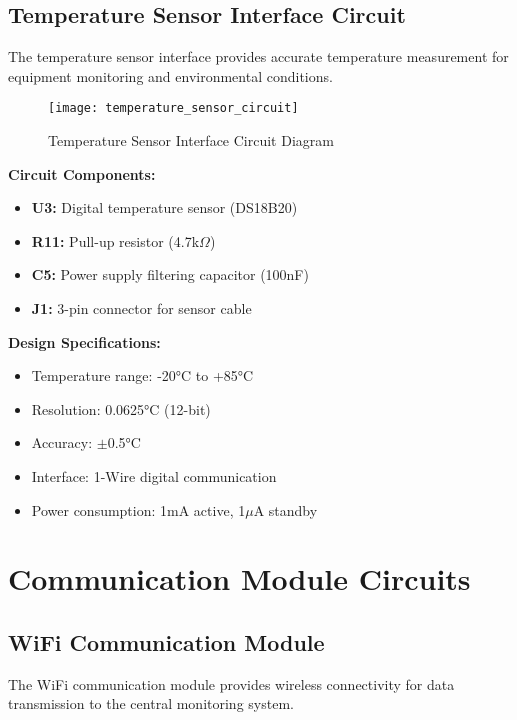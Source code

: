 \subsection{Temperature Sensor Interface Circuit}
\label{subsec:temperature_sensor_circuit}

The temperature sensor interface provides accurate temperature measurement for equipment monitoring and environmental conditions.

\begin{figure}[H]
\centering
\texttt{[image: temperature\_sensor\_circuit]}
\caption{Temperature Sensor Interface Circuit Diagram}
\label{fig:temperature_sensor_circuit}
\end{figure}

\textbf{Circuit Components:}
\begin{itemize}
\item \textbf{U3:} Digital temperature sensor (DS18B20)
\item \textbf{R11:} Pull-up resistor (4.7k$\Omega$)
\item \textbf{C5:} Power supply filtering capacitor (100nF)
\item \textbf{J1:} 3-pin connector for sensor cable
\end{itemize}

\textbf{Design Specifications:}
\begin{itemize}
\item Temperature range: -20°C to +85°C
\item Resolution: 0.0625°C (12-bit)
\item Accuracy: $\pm$0.5°C
\item Interface: 1-Wire digital communication
\item Power consumption: 1mA active, 1$\mu$A standby
\end{itemize}

\section{Communication Module Circuits}
\label{sec:communication_circuits}

\subsection{WiFi Communication Module}
\label{subsec:wifi_module_circuit}

The WiFi communication module provides wireless connectivity for data transmission to the central monitoring system.

